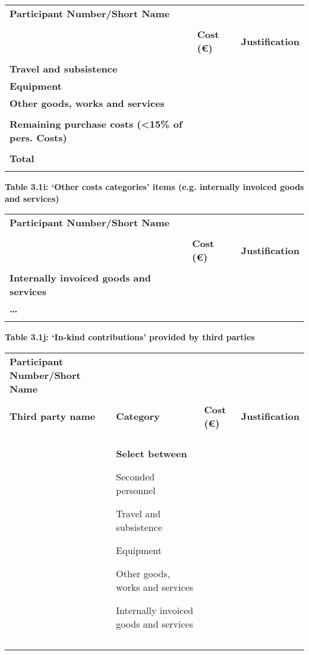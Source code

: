 \begin{longtable}[]{@{}lll@{}}
\toprule
\endhead
\textbf{Participant Number/Short Name} & & \\
& & \\
& \textbf{Cost (€)} & \textbf{Justification} \\
& & \\
\textbf{Travel and subsistence } & & \\
\textbf{Equipment } & & \\
\textbf{Other goods, works and services} & & \\
& & \\
\textbf{Remaining purchase costs (\textless15\% of pers. Costs)} & & \\
& & \\
\textbf{Total} & & \\
& & \\
\bottomrule
\end{longtable}

\textbf{Table 3.1i: `Other costs categories' items (e.g. internally
invoiced goods and services)}

\begin{longtable}[]{@{}lll@{}}
\toprule
\endhead
\textbf{Participant Number/Short Name} & & \\
& & \\
& \textbf{Cost (€)} & \textbf{Justification} \\
& & \\
\textbf{Internally invoiced goods and services} & & \\
\textbf{\ldots{}} & & \\
& & \\
\bottomrule
\end{longtable}

\textbf{Table 3.1j: `In-kind contributions' provided by third parties}

\begin{longtable}[]{@{}
  >{\raggedright\arraybackslash}p{}
  >{\raggedright\arraybackslash}p{}
  >{\raggedright\arraybackslash}p{}
  >{\raggedright\arraybackslash}p{}@{}}
\toprule
\endhead
\textbf{Participant Number/Short Name} & & & \\
& & & \\
\textbf{Third party name} & \textbf{Category} & \textbf{Cost (€)} &
\textbf{Justification} \\
& & & \\
& \textbf{Select between}

Seconded personnel

Travel and subsistence

Equipment

Other goods, works and services

Internally invoiced goods and services & & \\
& & & \\
& & & \\
\bottomrule
\end{longtable}

